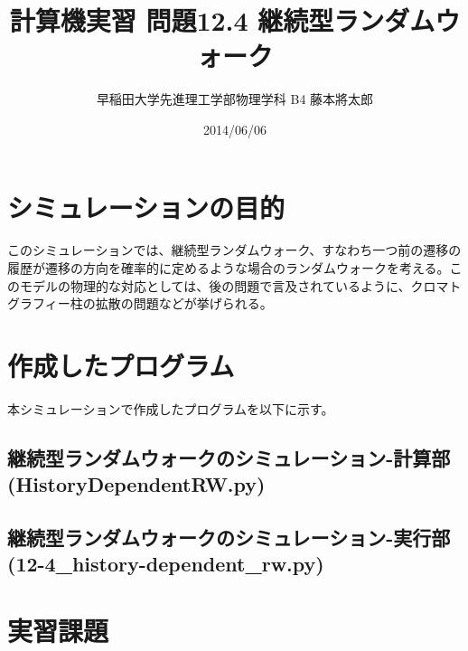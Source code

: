 \documentclass{jsarticle}
\title{計算機実習 問題12.4 継続型ランダムウォーク}
\author{早稲田大学先進理工学部物理学科 B4 藤本將太郎}
\date{2014/06/06}
\begin{document}
\maketitle
    
    \section{シミュレーションの目的}
        このシミュレーションでは、継続型ランダムウォーク、すなわち一つ前の遷移の履歴が遷移の方向を確率的に定めるような場合のランダムウォークを考える。このモデルの物理的な対応としては、後の問題で言及されているように、クロマトグラフィー柱の拡散の問題などが挙げられる。

        
    \section{作成したプログラム}
        本シミュレーションで作成したプログラムを以下に示す。
    
        
        \subsection{継続型ランダムウォークのシミュレーション-計算部(HistoryDependentRW.py)}
    
        \subsection{継続型ランダムウォークのシミュレーション-実行部(12-4\_history-dependent\_rw.py)}
            
    \section{実習課題}
    
\end{document}
